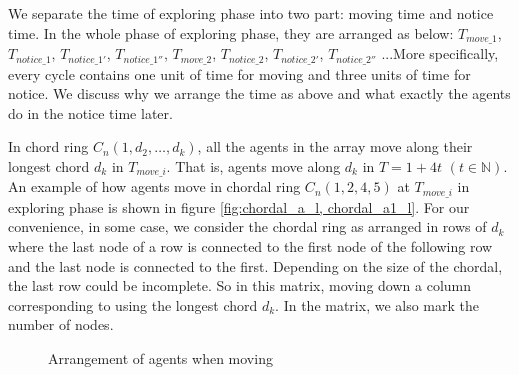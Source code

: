 \documentclass[conference]{IEEEtran}
\begin{document}
We separate the time of exploring phase into two part: moving time and notice time. In the whole phase of exploring phase, they are arranged as below: $T_{move\_1}$, $T_{notice\_1}$, $T_{notice\_1'}$, $T_{notice\_1''}$, $T_{move\_2}$, $T_{notice\_2}$, $T_{notice\_2'}$, $T_{notice\_2''}$ ...More specifically, every cycle contains one unit of time for moving and three units of time for notice. We discuss why we arrange the time as above and what exactly the agents do in the notice time later. 

In chord ring $C_n(1, d_2, \ldots, d_k)$, all the agents in the array move along their longest chord $d_k$ in $T_{move\_i}$. That is, agents move along $d_k$ in $T=1+4t$ $(t\in \mathbb{N})$.  An example of how agents move in chordal ring $C_n(1, 2 , 4, 5)$ at $T_{move\_i}$ in exploring phase is shown in figure \ref{fig:chordal_a_l, chordal_a1_l}. For our convenience, in some case, we consider the chordal ring as arranged in rows of $d_k$ where the last node of a row is connected to the first node of the following row and the last node is connected to the first. Depending on the size of the chordal, the last row could be incomplete. So in this matrix, moving down a column corresponding to using the longest chord $d_k$. In the matrix, we also mark the number of nodes.

\begin{figure}
  \centering 
  \hspace{1in} 
  \caption{Arrangement of agents when moving} 
  \label{fig:subfig} %
\end{figure}
\end{document}
